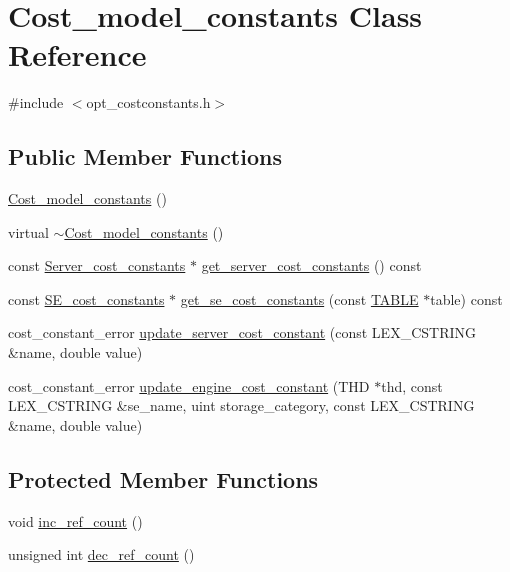\hypertarget{classCost__model__constants}{}\section{Cost\+\_\+model\+\_\+constants Class Reference}
\label{classCost__model__constants}


{\ttfamily \#include $<$opt\+\_\+costconstants.\+h$>$}

\subsection*{Public Member Functions}
\begin{DoxyCompactItemize}
\item 
\mbox{\hyperlink{classCost__model__constants_abfea15c18cc6e5fd5f628a867ca697af}{Cost\+\_\+model\+\_\+constants}} ()
\item 
virtual \mbox{\hyperlink{classCost__model__constants_ae47b6030a6f69f592639ea4e4b69274b}{$\sim$\+Cost\+\_\+model\+\_\+constants}} ()
\item 
const \mbox{\hyperlink{classServer__cost__constants}{Server\+\_\+cost\+\_\+constants}} $\ast$ \mbox{\hyperlink{classCost__model__constants_a745af7d6aac2594b6af661dca118d135}{get\+\_\+server\+\_\+cost\+\_\+constants}} () const
\item 
const \mbox{\hyperlink{classSE__cost__constants}{S\+E\+\_\+cost\+\_\+constants}} $\ast$ \mbox{\hyperlink{classCost__model__constants_a6b371182c2ed8f4b5e7e284ed88cb869}{get\+\_\+se\+\_\+cost\+\_\+constants}} (const \mbox{\hyperlink{structTABLE}{T\+A\+B\+LE}} $\ast$table) const
\item 
cost\+\_\+constant\+\_\+error \mbox{\hyperlink{classCost__model__constants_a106ef9b9856983ab651935e4249fe5d7}{update\+\_\+server\+\_\+cost\+\_\+constant}} (const L\+E\+X\+\_\+\+C\+S\+T\+R\+I\+NG \&name, double value)
\item 
cost\+\_\+constant\+\_\+error \mbox{\hyperlink{classCost__model__constants_aefa91f35a05d4254c67d63982924918e}{update\+\_\+engine\+\_\+cost\+\_\+constant}} (T\+HD $\ast$thd, const L\+E\+X\+\_\+\+C\+S\+T\+R\+I\+NG \&se\+\_\+name, uint storage\+\_\+category, const L\+E\+X\+\_\+\+C\+S\+T\+R\+I\+NG \&name, double value)
\end{DoxyCompactItemize}
\subsection*{Protected Member Functions}
\begin{DoxyCompactItemize}
\item 
void \mbox{\hyperlink{classCost__model__constants_ad55e6fc13b0e831511c5ee0a9b46fdfb}{inc\+\_\+ref\+\_\+count}} ()
\item 
unsigned int \mbox{\hyperlink{classCost__model__constants_aafb2e930ad709e1f4f57bd7fb29cfee0}{dec\+\_\+ref\+\_\+count}} ()
\end{DoxyCompactItemize}
